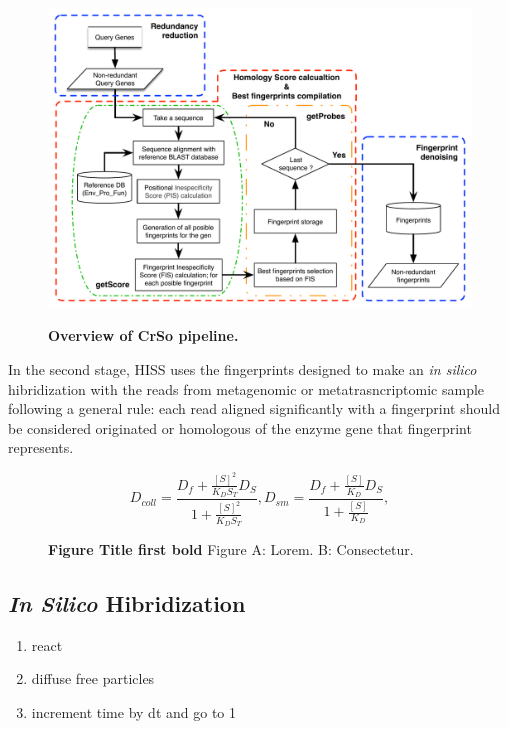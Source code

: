 \documentclass[10pt,letterpaper]{article}
\begin{document}
\begin{figure}[!htpb] 
\caption{{\bf Overview of CrSo pipeline.}
}
\centering
\label{fig2}
\includegraphics[width=1\textwidth,natwidth=610,natheight=642]{imgs/Fig2.pdf}\\

\end{figure}


In the second stage, HISS uses the fingerprints designed to make an \textit{in silico} hibridization with the reads from metagenomic or metatrasncriptomic sample following a general rule: each read aligned significantly with a fingerprint should be considered originated or homologous of the enzyme gene that fingerprint represents.

\begin{equation}\label{eq:schemeP}
D_{coll} = \frac{D_f+\frac{[S]^2}{K_D S_T} D_S} {1+\frac{[S]^2}{K_D S_T}},
D_{sm} = \frac{D_f+ \frac{[S]}{K_D} D_S}{1+\frac{[S]}{K_D}},
\end{equation}


\begin{figure}[!htpb]
\caption{{\bf Figure Title first bold}
Figure  A: Lorem. B: Consectetur.}
\label{fig3}
\end{figure}

\subsection*{\textit{In Silico} Hibridization}

\begin{enumerate}
\item{react}
\item{diffuse free particles}
\item{increment time by dt and go to 1}
\end{enumerate}
\end{document}
